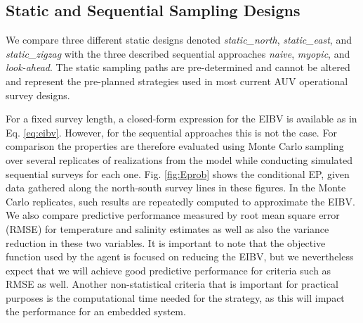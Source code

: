 \documentclass[aoas]{imsart}
\begin{document}
\subsection{Static and Sequential Sampling Designs}\label{sec:sampling_designs}


We compare three different static designs denoted
\textit{static\_north}, \textit{static\_east}, and
\textit{static\_zigzag} with the three described sequential approaches
\textit{naive}, \textit{myopic}, and \textit{look-ahead}. The static sampling paths are pre-determined and cannot be altered and represent the pre-planned strategies used in most current AUV
operational survey designs.

For a fixed survey length, a closed-form expression for the EIBV is available as in Eq. \eqref{eq:eibv}. However, for the sequential approaches this is not the
case. For comparison the properties are therefore evaluated using
Monte Carlo sampling over several replicates of realizations from the model while conducting simulated sequential surveys for each
one. Fig. \ref{fig:Eprob} shows the conditional EP, given data
gathered along the north-south survey lines in these figures. In the
Monte Carlo replicates, such results are repeatedly computed to
approximate the EIBV. We also compare predictive performance
measured by root mean square error (RMSE) for temperature and salinity
estimates as well as also the variance reduction in these two variables. It is
important to note that the objective function used by the agent is
focused on reducing the EIBV, but we nevertheless expect that
we will achieve good predictive performance for criteria such as RMSE
as well. Another non-statistical criteria that is important for
practical purposes is the computational time needed for the strategy,
as this will impact the performance for an embedded system.

\end{document}
